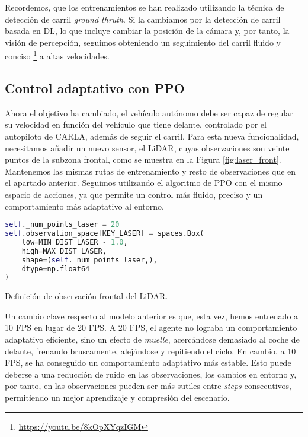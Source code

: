 Recordemos, que los entrenamientos se han realizado utilizando la técnica de detección de carril \textit{ground thruth}. Si la cambiamos por la detección de carril basada en \ac{DL}, lo que incluye cambiar la posición de la cámara y, por tanto, la visión de percepción, seguimos obteniendo un seguimiento del carril fluido y conciso \footnote{\url{ https://youtu.be/8kOpXYqzIGM}} a altas velocidades.

\subsection{Control adaptativo con PPO}

Ahora el objetivo ha cambiado, el vehículo autónomo debe ser capaz de regular su velocidad en función del vehículo que tiene delante, controlado por el autopiloto de CARLA, además de seguir el carril. Para esta nueva funcionalidad, necesitamos añadir un nuevo sensor, el \ac{LiDAR}, cuyas observaciones son veinte puntos de la subzona frontal, como se muestra en la Figura \ref{fig:laser_front}. Mantenemos las mismas rutas de entrenamiento y resto de observaciones que en el apartado anterior. Seguimos utilizando el algoritmo de \ac{PPO} con el mismo espacio de acciones, ya que permite un control más fluido, preciso y un comportamiento más adaptativo al entorno. 

\begin{code}[h]
\begin{lstlisting}[language=Python]
self._num_points_laser = 20
self.observation_space[KEY_LASER] = spaces.Box(
	low=MIN_DIST_LASER - 1.0,
	high=MAX_DIST_LASER,
	shape=(self._num_points_laser,),
	dtype=np.float64
)
\end{lstlisting}
\caption[Definición de observación frontal del \ac{LiDAR}]{Definición de observación frontal del \ac{LiDAR}.}
\label{cod:obs_laser_front}
\end{code}

Un cambio clave respecto al modelo anterior es que, esta vez, hemos entrenado a 10 \ac{FPS} en lugar de 20 \ac{FPS}. A 20 \ac{FPS}, el agente no lograba un comportamiento adaptativo eficiente, sino un efecto de \textit{muelle}, acercándose demasiado al coche de delante, frenando bruscamente, alejándose y repitiendo el ciclo. En cambio, a 10 \ac{FPS}, se ha conseguido un comportamiento adaptativo más estable. Esto puede deberse a una reducción de ruido en las observaciones, los cambios en entorno y, por tanto, en las observaciones pueden ser más sutiles entre \textit{steps} consecutivos, permitiendo un mejor aprendizaje y compresión del escenario.

